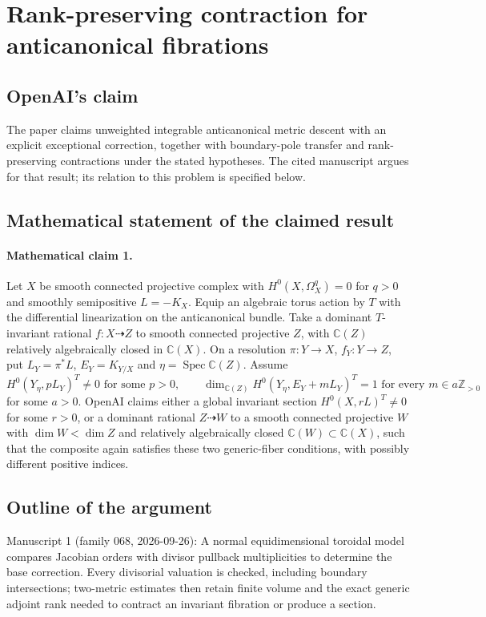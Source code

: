 \documentclass[11pt]{article}
\begin{document}
\section*{Rank-preserving contraction for anticanonical fibrations}

\subsection{OpenAI's claim}
The paper claims unweighted integrable anticanonical metric descent with an explicit exceptional correction, together with boundary-pole transfer and rank-preserving contractions under the stated hypotheses. The cited manuscript argues for that result; its relation to this problem is specified below.

\subsection{Mathematical statement of the claimed result}
\paragraph{Mathematical claim 1.} Let $X$ be smooth connected projective complex with $H^0(X,\Omega_X^q)=0$ for $q>0$ and smoothly semipositive $L=-K_X$. Equip an algebraic torus action by $T$ with the differential linearization on the anticanonical bundle. Take a dominant $T$-invariant rational $f:X\dashrightarrow Z$ to smooth connected projective $Z$, with $\mathbb C(Z)$ relatively algebraically closed in $\mathbb C(X)$. On a resolution $\pi:Y\to X$, $f_Y:Y\to Z$, put $L_Y=\pi^*L$, $E_Y=K_{Y/X}$ and $\eta=\operatorname{Spec}\mathbb C(Z)$. Assume
\[
H^0(Y_\eta,pL_Y)^T\ne0\text{ for some }p>0,\qquad
\dim_{\mathbb C(Z)}H^0(Y_\eta,E_Y+mL_Y)^T=1\text{ for every }m\in a\mathbb Z_{>0}
\]
for some $a>0$. OpenAI claims either a global invariant section $H^0(X,rL)^T\ne0$ for some $r>0$, or a dominant rational $Z\dashrightarrow W$ to a smooth connected projective $W$ with $\dim W<\dim Z$ and relatively algebraically closed $\mathbb C(W)\subset\mathbb C(X)$, such that the composite again satisfies these two generic-fiber conditions, with possibly different positive indices.

\subsection{Outline of the argument}
Manuscript 1 (family 068, 2026-09-26): A normal equidimensional toroidal model compares Jacobian orders with divisor pullback multiplicities to determine the base correction. Every divisorial valuation is checked, including boundary intersections; two-metric estimates then retain finite volume and the exact generic adjoint rank needed to contract an invariant fibration or produce a section.
\end{document}
